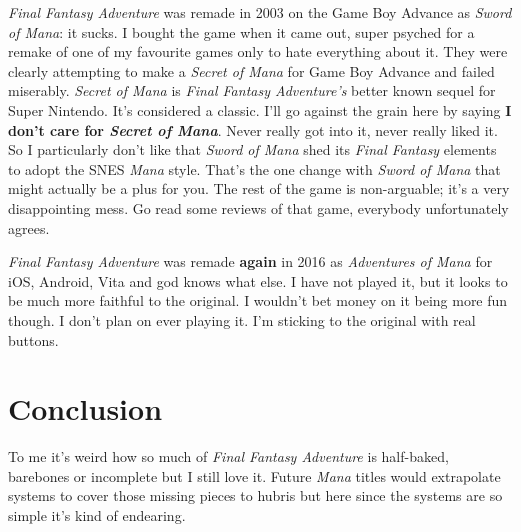 \documentclass{book}
\begin{document}
\emph{Final Fantasy Adventure} was remade in 2003 on the Game Boy Advance as \emph{Sword of Mana}: it sucks. I bought the game when it came out, super psyched for a remake of one of my favourite games only to hate everything about it. They were clearly attempting to make a \emph{Secret of Mana} for Game Boy Advance and failed miserably. \emph{Secret of Mana} is \emph{Final Fantasy Adventure’s} better known sequel for Super Nintendo. It’s considered a classic. I’ll go against the grain here by saying \textbf{I don’t care for \emph{Secret of Mana}}. Never really got into it, never really liked it. So I particularly don’t like that \emph{Sword of Mana} shed its \emph{Final Fantasy} elements to adopt the SNES \emph{Mana} style. That’s the one change with \emph{Sword of Mana} that might actually be a plus for you. The rest of the game is non-arguable; it’s a very disappointing mess. Go read some reviews of that game, everybody unfortunately agrees.

\emph{Final Fantasy Adventure} was remade \textbf{again} in 2016 as \emph{Adventures of Mana} for iOS, Android, Vita and god knows what else. I have not played it, but it looks to be much more faithful to the original. I wouldn’t bet money on it being more fun though. I don’t plan on ever playing it. I’m sticking to the original with real buttons.

\FloatBarrier\needspace{10mm}\section*{Conclusion}\nopagebreak[4]

To me it’s weird how so much of \emph{Final Fantasy Adventure} is half-baked, barebones or incomplete but I still love it. Future \emph{Mana} titles would extrapolate systems to cover those missing pieces to hubris but here since the systems are so simple it’s kind of endearing.
\end{document}
